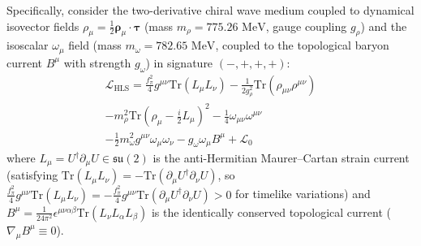 \documentclass[10pt,aps,prd,twocolumn,superscriptaddress,nofootinbib,floatfix,longbibliography,showkeys]{revtex4-2}
\begin{document}
Specifically, consider the two-derivative chiral wave medium coupled to dynamical isovector fields $\rho_\mu = \frac{1}{2}\boldsymbol{\rho}_\mu \cdot \boldsymbol{\tau}$ (mass $m_\rho = 775.26\text{ MeV}$, gauge coupling $g_\rho$) and the isoscalar $\omega_\mu$ field (mass $m_\omega = 782.65\text{ MeV}$, coupled to the topological baryon current $B^\mu$ with strength $g_\omega$) in signature $(-,+,+,+)$:
\begin{multline}
\mathcal{L}_{\text{HLS}} = \frac{f_\pi^2}{4}g^{\mu\nu}\text{Tr}(L_\mu L_\nu) - \frac{1}{2g_\rho^2}\text{Tr}(\rho_{\mu\nu}\rho^{\mu\nu}) \\
- m_\rho^2\text{Tr}\!\left(\rho_\mu - \frac{i}{2}L_\mu\right)^2 - \frac{1}{4}\omega_{\mu\nu}\omega^{\mu\nu} \\
- \frac{1}{2}m_\omega^2 g^{\mu\nu}\omega_\mu \omega_\nu - g_\omega \omega_\mu B^\mu + \mathcal{L}_0
\end{multline}
where $L_\mu = U^\dagger \partial_\mu U \in \mathfrak{su}(2)$ is the anti-Hermitian Maurer--Cartan strain current (satisfying $\text{Tr}(L_\mu L_\nu) = \allowbreak -\text{Tr}(\partial_\mu U^\dagger \partial_\nu U)$, so $\frac{f_\pi^2}{4}g^{\mu\nu}\text{Tr}(L_\mu L_\nu) = \allowbreak -\frac{f_\pi^2}{4}g^{\mu\nu}\text{Tr}(\partial_\mu U^\dagger \partial_\nu U) > 0$ for timelike variations) and $B^\mu = \allowbreak \frac{1}{24\pi^2}\epsilon^{\mu\nu\alpha\beta}\text{Tr}(L_\nu L_\alpha L_\beta)$ is the identically conserved topological current ($\nabla_\mu B^\mu \equiv 0$).
\end{document}
